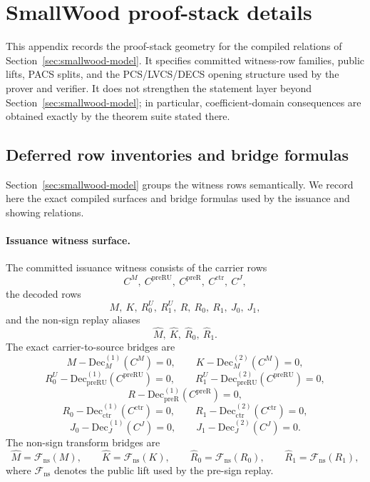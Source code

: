 \section{SmallWood proof-stack details}
\label{app:smallwood}
\label{app:smallwood-details}

This appendix records the proof-stack geometry for the compiled relations of
Section~\ref{sec:smallwood-model}. It specifies committed witness-row families,
public lifts, PACS splits, and the PCS/LVCS/DECS opening structure used by the
prover and verifier. It does not strengthen the statement layer beyond
Section~\ref{sec:smallwood-model}; in particular, coefficient-domain
consequences are obtained exactly by the theorem suite stated there.

\newcommand{\NTT}{\mathrm{NTT}}

\subsection{Deferred row inventories and bridge formulas}
\label{subsec:smallwood-row-inventories}

Section~\ref{sec:smallwood-model} groups the witness rows semantically. We record here the exact compiled surfaces and
bridge formulas used by the issuance and showing relations.

\paragraph{Issuance witness surface.}
The committed issuance witness consists of the carrier rows
\[
C^M,\ C^{\mathrm{preRU}},\ C^{\mathrm{preR}},\ C^{\mathrm{ctr}},\ C^J,
\]
the decoded rows
\[
M,\ K,\ R_0^U,\ R_1^U,\ R,\ R_0,\ R_1,\ J_0,\ J_1,
\]
and the non-sign replay aliases
\[
\widehat M,\ \widehat K,\ \widehat R_0,\ \widehat R_1.
\]
The exact carrier-to-source bridges are
\[
M-\mathrm{Dec}_M^{(1)}(C^M)=0,
\qquad
K-\mathrm{Dec}_M^{(2)}(C^M)=0,
\]
\[
R_0^U-\mathrm{Dec}_{\mathrm{preRU}}^{(1)}(C^{\mathrm{preRU}})=0,
\qquad
R_1^U-\mathrm{Dec}_{\mathrm{preRU}}^{(2)}(C^{\mathrm{preRU}})=0,
\]
\[
R-\mathrm{Dec}_{\mathrm{preR}}^{(1)}(C^{\mathrm{preR}})=0,
\]
\[
R_0-\mathrm{Dec}_{\mathrm{ctr}}^{(1)}(C^{\mathrm{ctr}})=0,
\qquad
R_1-\mathrm{Dec}_{\mathrm{ctr}}^{(2)}(C^{\mathrm{ctr}})=0,
\]
\[
J_0-\mathrm{Dec}_J^{(1)}(C^J)=0,
\qquad
J_1-\mathrm{Dec}_J^{(2)}(C^J)=0.
\]
The non-sign transform bridges are
\[
\widehat M = \mathcal F_{\mathrm{ns}}(M),
\qquad
\widehat K = \mathcal F_{\mathrm{ns}}(K),
\qquad
\widehat R_0 = \mathcal F_{\mathrm{ns}}(R_0),
\qquad
\widehat R_1 = \mathcal F_{\mathrm{ns}}(R_1),
\]
where \(\mathcal F_{\mathrm{ns}}\) denotes the public lift used by the pre-sign replay.

